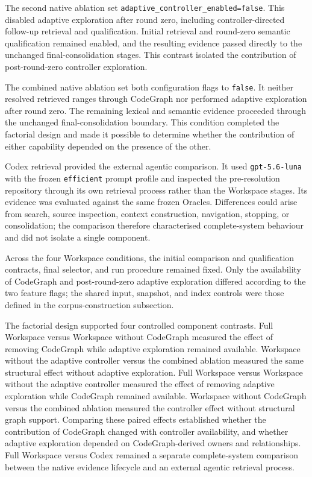The second native ablation set \texttt{adaptive\_controller\_enabled=false}. This disabled adaptive exploration after round zero, including controller-directed follow-up retrieval and qualification. Initial retrieval and round-zero semantic qualification remained enabled, and the resulting evidence passed directly to the unchanged final-consolidation stages. This contrast isolated the contribution of post-round-zero controller exploration.

The combined native ablation set both configuration flags to \texttt{false}. It neither resolved retrieved ranges through CodeGraph nor performed adaptive exploration after round zero. The remaining lexical and semantic evidence proceeded through the unchanged final-consolidation boundary. This condition completed the factorial design and made it possible to determine whether the contribution of either capability depended on the presence of the other.

Codex retrieval provided the external agentic comparison. It used \texttt{gpt-5.6-luna} with the frozen \texttt{efficient} prompt profile and inspected the pre-resolution repository through its own retrieval process rather than the Workspace stages. Its evidence was evaluated against the same frozen Oracles. Differences could arise from search, source inspection, context construction, navigation, stopping, or consolidation; the comparison therefore characterised complete-system behaviour and did not isolate a single component.

Across the four Workspace conditions, the initial comparison and qualification contracts, final selector, and run procedure remained fixed. Only the availability of CodeGraph and post-round-zero adaptive exploration differed according to the two feature flags; the shared input, snapshot, and index controls were those defined in the corpus-construction subsection.

The factorial design supported four controlled component contrasts. Full Workspace versus Workspace without CodeGraph measured the effect of removing CodeGraph while adaptive exploration remained available. Workspace without the adaptive controller versus the combined ablation measured the same structural effect without adaptive exploration. Full Workspace versus Workspace without the adaptive controller measured the effect of removing adaptive exploration while CodeGraph remained available. Workspace without CodeGraph versus the combined ablation measured the controller effect without structural graph support. Comparing these paired effects established whether the contribution of CodeGraph changed with controller availability, and whether adaptive exploration depended on CodeGraph-derived owners and relationships. Full Workspace versus Codex remained a separate complete-system comparison between the native evidence lifecycle and an external agentic retrieval process.

